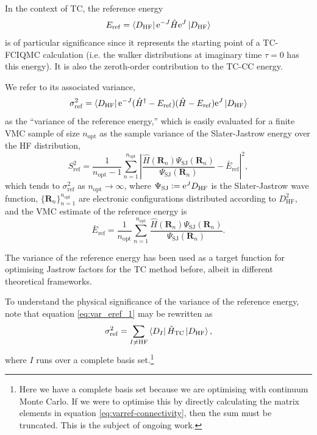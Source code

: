 In the context of TC, the reference energy
\begin{equation}
    E_\mathrm{ref} = \bra{D_\mathrm{HF}}\mathrm{e}^{-J}\hat H\mathrm{e}^J\ket{D_\mathrm{HF}}
\end{equation}
is of particular significance since it represents the starting point of a TC-FCIQMC calculation (i.e. the walker distributions at imaginary time $\tau=0$ has this energy). It is also the zeroth-order contribution to the TC-\gls{CC} energy.

We refer to its associated variance,
\begin{equation}
  \label{eq:var_eref_1}
  \sigma_\mathrm{ref}^2 =
    \bra{D_\mathrm{HF}}\mathrm{e}^{-J} (\hat H^\dag-E_\mathrm{ref})(\hat H-E_\mathrm{ref}) \mathrm{e}^J\ket{D_\mathrm{HF}}
\end{equation}
as the ``variance of the reference energy,'' which is easily evaluated for a finite VMC sample of size $n_\mathrm{opt}$ as the sample variance of the Slater-Jastrow energy over the HF distribution,
\begin{equation}
    S_\mathrm{ref}^2 =
      \frac 1 {n_\mathrm{opt}-1}
      \sum_{n=1}^{n_\mathrm{opt}}
        \left| \frac {\hat H({\bm R}_n) \Psi_\mathrm{SJ}({\bm R}_n)}
                     {\Psi_\mathrm{SJ}({\bm R}_n)} - {\bar E}_\mathrm{ref}
        \right|^2,
\end{equation}
which tends to $\sigma_\mathrm{ref}^2$ as $n_\mathrm{opt}\to\infty$, where $\Psi_\mathrm{SJ}\mathrel{\mathop:}= \mathrm{e}^JD_\mathrm{HF}$ is the Slater-Jastrow wave function, $\{{\bm R}_n\}_{n=1}^{n_\mathrm{opt}}$ are electronic
configurations distributed according to $D_\mathrm{HF}^2$, and the VMC
estimate of the reference energy is
\begin{equation}
    {\bar E}_\mathrm{ref} =
      \frac 1 {n_\mathrm{opt}}
      \sum_{n=1}^{n_\mathrm{opt}}
        \frac {\hat H({\bm R}_n) \Psi_\mathrm{SJ}({\bm R}_n)}
              {\Psi_\mathrm{SJ}({\bm R}_n)}.
\end{equation}

The variance of the reference energy has been used as a target function for optimising Jastrow factors for the TC method before, albeit in different theoretical frameworks.

To understand the physical significance of the variance of the reference energy, note that equation \ref{eq:var_eref_1} may be rewritten as
\begin{equation}
    \label{eq:varref-connectivity}
    \sigma_\mathrm{ref}^2 = \sum_{I\neq \mathrm{HF}}\bra{D_I}\hat H_\mathrm{TC}\ket{D_\mathrm{HF}},
\end{equation}
where $I$ runs over a complete basis set.\footnote{Here we have a complete basis set because we are optimising with continuum Monte Carlo. If we were to optimise this by directly calculating the matrix elements in equation \ref{eq:varref-connectivity}, then the sum must be truncated. This is the subject of ongoing work.}

